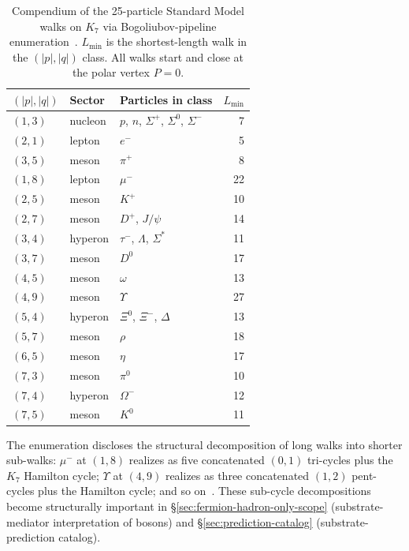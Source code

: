 \documentclass[11pt]{article}
\begin{document}
\begin{table}[h]
\centering
\caption{Compendium of the 25-particle Standard Model walks on $K_7$ via Bogoliubov-pipeline enumeration~\cite{BogoliubovPipeline}.  $L_{\min}$ is the shortest-length walk in the $(|p|, |q|)$ class.  All walks start and close at the polar vertex $P = 0$.}
\label{tab:walks-25}
\small
\begin{tabular}{lllr}
\toprule
$(|p|, |q|)$ & Sector & Particles in class & $L_{\min}$ \\
\midrule
$(1, 3)$ & nucleon & $p$, $n$, $\Sigma^+$, $\Sigma^0$, $\Sigma^-$ & 7 \\
$(2, 1)$ & lepton  & $e^-$                                       & 5 \\
$(3, 5)$ & meson   & $\pi^+$                                     & 8 \\
$(1, 8)$ & lepton  & $\mu^-$                                     & 22 \\
$(2, 5)$ & meson   & $K^+$                                       & 10 \\
$(2, 7)$ & meson   & $D^+$, $J/\psi$                             & 14 \\
$(3, 4)$ & hyperon & $\tau^-$, $\Lambda$, $\Sigma^*$             & 11 \\
$(3, 7)$ & meson   & $D^0$                                       & 17 \\
$(4, 5)$ & meson   & $\omega$                                    & 13 \\
$(4, 9)$ & meson   & $\Upsilon$                                  & 27 \\
$(5, 4)$ & hyperon & $\Xi^0$, $\Xi^-$, $\Delta$                  & 13 \\
$(5, 7)$ & meson   & $\rho$                                      & 18 \\
$(6, 5)$ & meson   & $\eta$                                      & 17 \\
$(7, 3)$ & meson   & $\pi^0$                                     & 10 \\
$(7, 4)$ & hyperon & $\Omega^-$                                  & 12 \\
$(7, 5)$ & meson   & $K^0$                                       & 11 \\
\bottomrule
\end{tabular}
\end{table}

The enumeration discloses the structural decomposition of long walks into shorter sub-walks: $\mu^-$ at $(1, 8)$ realizes as five concatenated $(0, 1)$ tri-cycles plus the $K_7$ Hamilton cycle; $\Upsilon$ at $(4, 9)$ realizes as three concatenated $(1, 2)$ pent-cycles plus the Hamilton cycle; and so on~\cite{BogoliubovPipeline}.  These sub-cycle decompositions become structurally important in \S\ref{sec:fermion-hadron-only-scope} (substrate-mediator interpretation of bosons) and \S\ref{sec:prediction-catalog} (substrate-prediction catalog).
\end{document}
